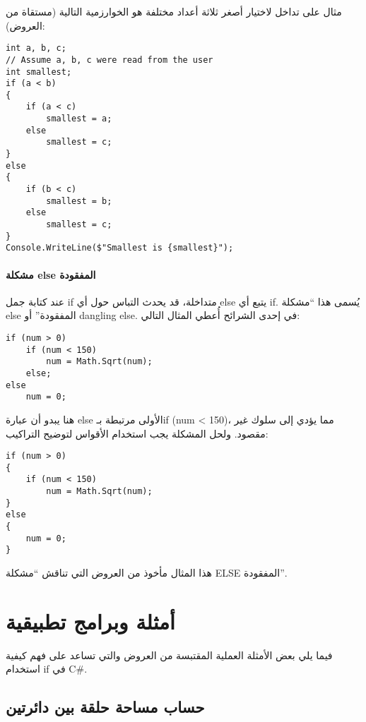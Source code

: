 \documentclass[12pt]{article}
\begin{document}
مثال على تداخل لاختيار أصغر ثلاثة أعداد مختلفة هو الخوارزمية التالية (مستقاة من العروض):


\begin{english}
\begin{verbatim}
int a, b, c;
// Assume a, b, c were read from the user
int smallest;
if (a < b)
{
    if (a < c)
        smallest = a;
    else
        smallest = c;
}
else
{
    if (b < c)
        smallest = b;
    else
        smallest = c;
}
Console.WriteLine($"Smallest is {smallest}");
\end{verbatim}
\end{english}

\paragraph{مشكلة \textenglish{else} المفقودة} عند كتابة جمل \textenglish{if} متداخلة، قد يحدث التباس حول أي \textenglish{else} يتبع أي \textenglish{if}. يُسمى هذا ``مشكلة \textenglish{else} المفقودة'' أو \textenglish{dangling else}. في إحدى الشرائح أُعطي المثال التالي:

\begin{english}
\begin{verbatim}
if (num > 0)
    if (num < 150)
        num = Math.Sqrt(num);
    else;
else
    num = 0;
\end{verbatim}
\end{english}

هنا يبدو أن عبارة \textenglish{else} الأولى مرتبطة بـ\textenglish{if (num < 150)}، مما يؤدي إلى سلوك غير مقصود. ولحل المشكلة يجب استخدام الأقواس لتوضيح التراكيب:

\begin{english}
\begin{verbatim}
if (num > 0)
{
    if (num < 150)
        num = Math.Sqrt(num);
}
else
{
    num = 0;
}
\end{verbatim}
\end{english}

هذا المثال مأخوذ من العروض التي تناقش ``مشكلة \textenglish{ELSE} المفقودة''.

\section{أمثلة وبرامج تطبيقية}

فيما يلي بعض الأمثلة العملية المقتبسة من العروض والتي تساعد على فهم كيفية استخدام \textenglish{if} في C\#.

\subsection{حساب مساحة حلقة بين دائرتين}
\end{document}
